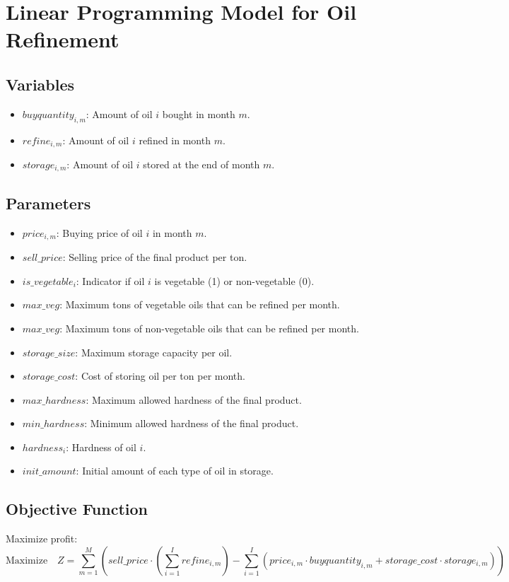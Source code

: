 \documentclass{article}
\begin{document}
\section*{Linear Programming Model for Oil Refinement}

\subsection*{Variables}
\begin{itemize}
    \item \( buyquantity_{i,m} \): Amount of oil \( i \) bought in month \( m \).
    \item \( refine_{i,m} \): Amount of oil \( i \) refined in month \( m \).
    \item \( storage_{i,m} \): Amount of oil \( i \) stored at the end of month \( m \).
\end{itemize}

\subsection*{Parameters}
\begin{itemize}
    \item \( price_{i,m} \): Buying price of oil \( i \) in month \( m \).
    \item \( sell\_price \): Selling price of the final product per ton.
    \item \( is\_vegetable_{i} \): Indicator if oil \( i \) is vegetable (1) or non-vegetable (0).
    \item \( max\_veg \): Maximum tons of vegetable oils that can be refined per month.
    \item \( max\_veg \): Maximum tons of non-vegetable oils that can be refined per month.
    \item \( storage\_size \): Maximum storage capacity per oil.
    \item \( storage\_cost \): Cost of storing oil per ton per month.
    \item \( max\_hardness \): Maximum allowed hardness of the final product.
    \item \( min\_hardness \): Minimum allowed hardness of the final product.
    \item \( hardness_{i} \): Hardness of oil \( i \).
    \item \( init\_amount \): Initial amount of each type of oil in storage.
\end{itemize}

\subsection*{Objective Function}
Maximize profit:
\[
\text{Maximize} \quad Z = \sum_{m=1}^{M} \left( sell\_price \cdot ( \sum_{i=1}^{I} refine_{i,m} ) - \sum_{i=1}^{I} \left( price_{i,m} \cdot buyquantity_{i,m} + storage\_cost \cdot storage_{i,m} \right) \right)
\]
\end{document}
